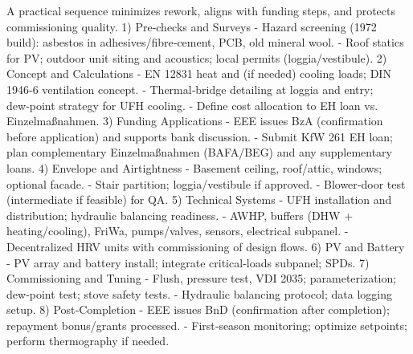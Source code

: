 \markdownRendererDocumentBegin
\markdownRendererSectionBegin
{}\markdownRendererInterblockSeparator
{}A practical sequence minimizes rework, aligns with funding steps, and protects commissioning quality.\markdownRendererInterblockSeparator
{}\markdownRendererSectionBegin
{}\markdownRendererInterblockSeparator
{}1) Pre‑checks and Surveys - Hazard screening (1972 build): asbestos in adhesives/fibre‑cement, PCB, old mineral wool. - Roof statics for PV; outdoor unit siting and acoustics; local permits (loggia/vestibule).\markdownRendererInterblockSeparator
{}2) Concept and Calculations - EN 12831 heat and (if needed) cooling loads; DIN 1946‑6 ventilation concept. - Thermal‑bridge detailing at loggia and entry; dew‑point strategy for UFH cooling. - Define cost allocation to EH loan vs. Einzelmaßnahmen.\markdownRendererInterblockSeparator
{}3) Funding Applications - EEE issues BzA (confirmation before application) and supports bank discussion. - Submit KfW 261 EH loan; plan complementary Einzelmaßnahmen (BAFA/BEG) and any supplementary loans.\markdownRendererInterblockSeparator
{}4) Envelope and Airtightness - Basement ceiling, roof/attic, windows; optional facade. - Stair partition; loggia/vestibule if approved. - Blower‑door test (intermediate if feasible) for QA.\markdownRendererInterblockSeparator
{}5) Technical Systems - UFH installation and distribution; hydraulic balancing readiness. - AWHP, buffers (DHW + heating/cooling), FriWa, pumps/valves, sensors, electrical subpanel. - Decentralized HRV units with commissioning of design flows.\markdownRendererInterblockSeparator
{}6) PV and Battery - PV array and battery install; integrate critical‑loads subpanel; SPDs.\markdownRendererInterblockSeparator
{}7) Commissioning and Tuning - Flush, pressure test, VDI 2035; parameterization; dew‑point test; stove safety tests. - Hydraulic balancing protocol; data logging setup.\markdownRendererInterblockSeparator
{}8) Post‑Completion - EEE issues BnD (confirmation after completion); repayment bonus/grants processed. - First‑season monitoring; optimize setpoints; perform thermography if needed.
\markdownRendererSectionEnd 
\markdownRendererSectionEnd \markdownRendererDocumentEnd